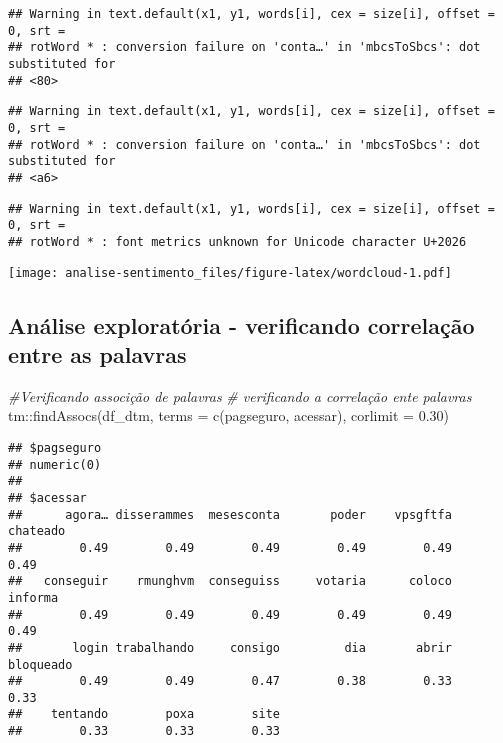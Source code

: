 \documentclass[
]{article}
\newenvironment{Shaded}{\begin{snugshade}}{\end{snugshade}}
\newcommand{\AttributeTok}[1]{\textcolor[rgb]{0.77,0.63,0.00}{#1}}
\newcommand{\CommentTok}[1]{\textcolor[rgb]{0.56,0.35,0.01}{\textit{#1}}}
\newcommand{\FloatTok}[1]{\textcolor[rgb]{0.00,0.00,0.81}{#1}}
\newcommand{\FunctionTok}[1]{\textcolor[rgb]{0.00,0.00,0.00}{#1}}
\newcommand{\NormalTok}[1]{#1}
\newcommand{\SpecialCharTok}[1]{\textcolor[rgb]{0.00,0.00,0.00}{#1}}
\newcommand{\StringTok}[1]{\textcolor[rgb]{0.31,0.60,0.02}{#1}}
\begin{document}
\begin{verbatim}
## Warning in text.default(x1, y1, words[i], cex = size[i], offset = 0, srt =
## rotWord * : conversion failure on 'conta…' in 'mbcsToSbcs': dot substituted for
## <80>
\end{verbatim}

\begin{verbatim}
## Warning in text.default(x1, y1, words[i], cex = size[i], offset = 0, srt =
## rotWord * : conversion failure on 'conta…' in 'mbcsToSbcs': dot substituted for
## <a6>
\end{verbatim}

\begin{verbatim}
## Warning in text.default(x1, y1, words[i], cex = size[i], offset = 0, srt =
## rotWord * : font metrics unknown for Unicode character U+2026
\end{verbatim}

\texttt{[image: analise-sentimento\_files/figure-latex/wordcloud-1.pdf]}

\hypertarget{anuxe1lise-exploratuxf3ria---verificando-correlauxe7uxe3o-entre-as-palavras}{%
\subsection{Análise exploratória - verificando correlação entre as
palavras}\label{anuxe1lise-exploratuxf3ria---verificando-correlauxe7uxe3o-entre-as-palavras}}

\begin{Shaded}
\begin{Highlighting}[]
\CommentTok{\#Verificando associção de palavras}
\CommentTok{\# verificando a correlação ente palavras}
\NormalTok{tm}\SpecialCharTok{::}\FunctionTok{findAssocs}\NormalTok{(df\_dtm, }\AttributeTok{terms =} \FunctionTok{c}\NormalTok{(}\StringTok{\textquotesingle{}pagseguro\textquotesingle{}}\NormalTok{, }\StringTok{\textquotesingle{}acessar\textquotesingle{}}\NormalTok{), }\AttributeTok{corlimit =} \FloatTok{0.30}\NormalTok{)}
\end{Highlighting}
\end{Shaded}

\begin{verbatim}
## $pagseguro
## numeric(0)
## 
## $acessar
##      agora… disserammes  mesesconta       poder    vpsgftfa    chateado 
##        0.49        0.49        0.49        0.49        0.49        0.49 
##   conseguir    rmunghvm  conseguiss     votaria      coloco     informa 
##        0.49        0.49        0.49        0.49        0.49        0.49 
##       login trabalhando     consigo         dia       abrir   bloqueado 
##        0.49        0.49        0.47        0.38        0.33        0.33 
##    tentando        poxa        site 
##        0.33        0.33        0.33
\end{verbatim}
\end{document}
